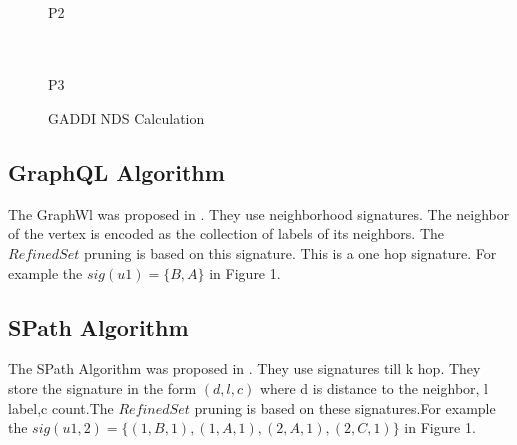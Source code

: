 \begin{figure}
\begin{minipage}{.35\textwidth}
\\ P2\\ \hfill \\
\\ P3
\end{minipage}
\caption{GADDI NDS Calculation}
\end{figure}
 \subsection{GraphQL Algorithm}
 \label{sec:gql}
\hspace{10mm}The GraphWl was proposed in \cite{GQL}. They use neighborhood signatures. The neighbor of the vertex is encoded as the collection of labels of its neighbors.  The $RefinedSet$  pruning is based on this signature. This is a one hop signature. For example the $sig(u1) =\{B,A\}$ in Figure 1.

\subsection{SPath Algorithm}
\label{sec:spath}
\hspace{10mm}The SPath Algorithm was proposed in \cite{SPA}. They use signatures till k hop. They store the signature in the form $(d,l,c)$ where d is distance to the neighbor, l label,c count.The $RefinedSet$  pruning is based on these signatures.For example the $sig(u1,2) = \{(1,B,1),(1,A,1),(2,A,1),(2,C,1)\}$ in Figure 1.
